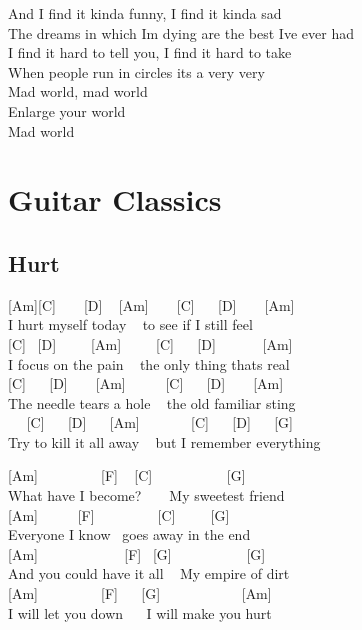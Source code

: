 \documentclass[
  letterpaper,
]{scrbook}
\begin{document}
And I find it kinda funny, I find it kinda sad\\
The dreams in which I\textquotesingle m dying are the best
I\textquotesingle ve ever had\\
I find it hard to tell you, I find it hard to take\\
When people run in circles it\textquotesingle s a very very\\
Mad world, mad world\\
Enlarge your world\\
Mad world

\part{Guitar Classics}

\hypertarget{hurt}{%
\chapter{Hurt}\label{hurt}}

{[}Am{]}{[}C{]} ~ ~ {[}D{]} ~ {[}Am{]} ~ ~ {[}C{]} ~ ~{[}D{]} ~ ~
{[}Am{]}\\
\hspace*{0.333em} I hurt myself today ~ to see if I still feel\\
{[}C{]} ~{[}D{]} ~ ~ ~{[}Am{]} ~ ~ ~{[}C{]} ~ ~{[}D{]} ~ ~ ~ ~{[}Am{]}\\
I focus on the pain ~ the only thing that\textquotesingle s real\\
\hspace*{0.333em} {[}C{]} ~ ~{[}D{]} ~ ~ {[}Am{]} ~ ~ ~ {[}C{]} ~
~{[}D{]} ~ ~ {[}Am{]}\\
The needle tears a hole ~ the old familiar sting\\
\hspace*{0.333em} ~ ~{[}C{]} ~ ~{[}D{]} ~ ~{[}Am{]} ~ ~ ~ ~ {[}C{]} ~
~{[}D{]} ~ ~{[}G{]} ~ ~ ~ ~\\
Try to kill it all away ~ but I remember everything

{[}Am{]} ~ ~ ~ ~ ~ {[}F{]} ~ {[}C{]} ~ ~ ~ ~ ~ ~ {[}G{]}\\
What have I become? ~ ~ My sweetest friend\\
{[}Am{]} ~ ~ ~ {[}F{]} ~ ~ ~ ~ ~ {[}C{]} ~ ~ ~{[}G{]}\\
Everyone I know ~goes away in the end\\
\hspace*{0.333em} {[}Am{]} ~ ~ ~ ~ ~ ~ ~ {[}F{]} ~{[}G{]} ~ ~ ~ ~ ~ ~
{[}G{]}\\
And you could have it all ~ My empire of dirt\\
{[}Am{]} ~ ~ ~ ~ ~ {[}F{]} ~ ~{[}G{]} ~ ~ ~ ~ ~ ~ ~{[}Am{]}\\
I will let you down ~ ~I will make you hurt
\end{document}
